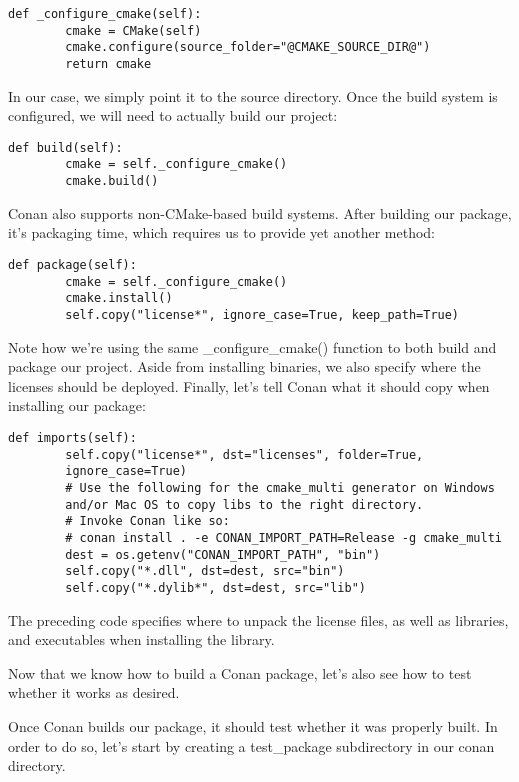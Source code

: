 \begin{lstlisting}[style=stylePython]
	def _configure_cmake(self):
		cmake = CMake(self)
		cmake.configure(source_folder="@CMAKE_SOURCE_DIR@")
		return cmake
\end{lstlisting}

In our case, we simply point it to the source directory. Once the build system is configured, we will need to actually build our project:

\begin{lstlisting}[style=stylePython]
	def build(self):
		cmake = self._configure_cmake()
		cmake.build()
\end{lstlisting}

Conan also supports non-CMake-based build systems. After building our package, it's packaging time, which requires us to provide yet another method:

\begin{lstlisting}[style=stylePython]
	def package(self):
		cmake = self._configure_cmake()
		cmake.install()
		self.copy("license*", ignore_case=True, keep_path=True)
\end{lstlisting}

Note how we're using the same \_configure\_cmake() function to both build and package our project. Aside from installing binaries, we also specify where the licenses should be deployed. Finally, let's tell Conan what it should copy when installing our package:

\begin{lstlisting}[style=stylePython]
	def imports(self):
		self.copy("license*", dst="licenses", folder=True,
		ignore_case=True)
		# Use the following for the cmake_multi generator on Windows
		and/or Mac OS to copy libs to the right directory.
		# Invoke Conan like so:
		# conan install . -e CONAN_IMPORT_PATH=Release -g cmake_multi
		dest = os.getenv("CONAN_IMPORT_PATH", "bin")
		self.copy("*.dll", dst=dest, src="bin")
		self.copy("*.dylib*", dst=dest, src="lib")
\end{lstlisting}

The preceding code specifies where to unpack the license files, as well as libraries, and executables when installing the library. 

Now that we know how to build a Conan package, let's also see how to test whether it works as desired.


Once Conan builds our package, it should test whether it was properly built. In order to do so, let's start by creating a test\_package subdirectory in our conan directory. 


